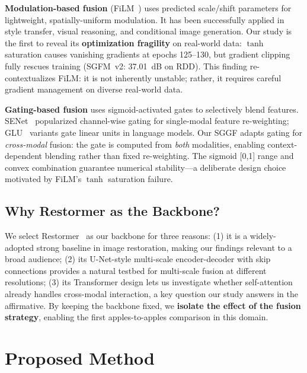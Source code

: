 \documentclass[11pt]{article}
\begin{document}
\textbf{Modulation-based fusion} (FiLM~\cite{perez2018film}) uses predicted scale/shift parameters for lightweight, spatially-uniform modulation.
It has been successfully applied in style transfer, visual reasoning, and conditional image generation.
Our study is the first to reveal its \textbf{optimization fragility} on real-world data: $\tanh$ saturation causes vanishing gradients at epochs 125--130, but gradient clipping fully rescues training (SGFM~v2: 37.01~dB on RDD).
This finding re-contextualizes FiLM: it is not inherently unstable; rather, it requires careful gradient management on diverse real-world data.

\textbf{Gating-based fusion} uses sigmoid-activated gates to selectively blend features.
SENet~\cite{hu2018squeeze} popularized channel-wise gating for single-modal feature re-weighting; GLU~\cite{shazeer2020glu} variants gate linear units in language models.
Our SGGF adapts gating for \textit{cross-modal} fusion: the gate is computed from \textit{both} modalities, enabling context-dependent blending rather than fixed re-weighting.
The sigmoid [0,1] range and convex combination guarantee numerical stability---a deliberate design choice motivated by FiLM's $\tanh$ saturation failure.

\subsection{Why Restormer as the Backbone?}

We select Restormer~\cite{zamir2022restormer} as our backbone for three reasons: (1) it is a widely-adopted strong baseline in image restoration, making our findings relevant to a broad audience; (2) its U-Net-style multi-scale encoder-decoder with skip connections provides a natural testbed for multi-scale fusion at different resolutions; (3) its Transformer design lets us investigate whether self-attention already handles cross-modal interaction, a key question our study answers in the affirmative.
By keeping the backbone fixed, we \textbf{isolate the effect of the fusion strategy}, enabling the first apples-to-apples comparison in this domain.

\section{Proposed Method}
\end{document}
